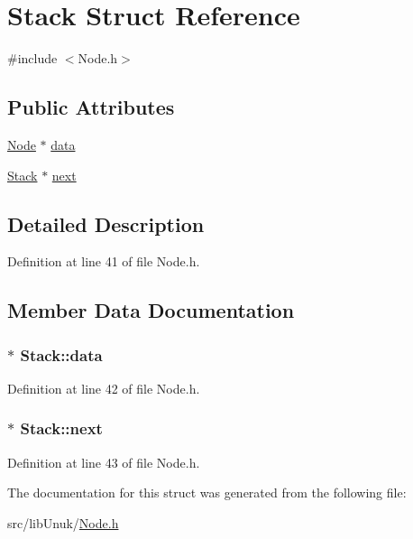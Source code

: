 \hypertarget{struct_stack}{
\section{Stack Struct Reference}
\label{struct_stack}
}


{\ttfamily \#include $<$Node.h$>$}

\subsection*{Public Attributes}
\begin{DoxyCompactItemize}
\item 
\hyperlink{class_node}{Node} $\ast$ \hyperlink{struct_stack_afb75952b7ab4d111446c905ccaac037d}{data}
\item 
\hyperlink{struct_stack}{Stack} $\ast$ \hyperlink{struct_stack_a7a6cf9dd6bb0d7f33317bbeb1e6a044d}{next}
\end{DoxyCompactItemize}


\subsection{Detailed Description}


Definition at line 41 of file Node.h.



\subsection{Member Data Documentation}
\hypertarget{struct_stack_afb75952b7ab4d111446c905ccaac037d}{
\subsubsection[{data}]{$\ast$ {\bf Stack::data}}}
\label{struct_stack_afb75952b7ab4d111446c905ccaac037d}


Definition at line 42 of file Node.h.

\hypertarget{struct_stack_a7a6cf9dd6bb0d7f33317bbeb1e6a044d}{
\subsubsection[{next}]{$\ast$ {\bf Stack::next}}}
\label{struct_stack_a7a6cf9dd6bb0d7f33317bbeb1e6a044d}


Definition at line 43 of file Node.h.



The documentation for this struct was generated from the following file:\begin{DoxyCompactItemize}
\item 
src/libUnuk/\hyperlink{_node_8h}{Node.h}\end{DoxyCompactItemize}
